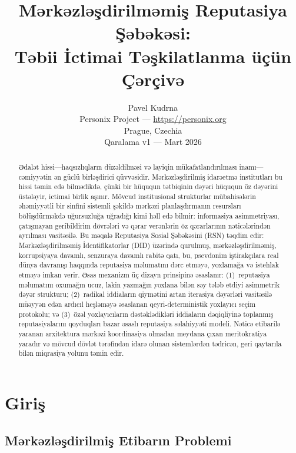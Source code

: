 \documentclass[11pt,a4paper,twocolumn]{article}
\title{\textbf{Mərkəzləşdirilməmiş Reputasiya Şəbəkəsi:\\Təbii İctimai Təşkilatlanma üçün Çərçivə}}
\author{Pavel Kudrna\\Personix Project --- \url{https://personix.org}\\Prague, Czechia\\Qaralama v1 --- Mart 2026}
\date{}
\begin{document}
\maketitle

\begin{abstract}
Ədalət hissi---haqsızlıqların düzəldilməsi və layiqin mükafatlandırılması inamı---cəmiyyətin ən güclü birləşdirici qüvvəsidir. Mərkəzləşdirilmiş idarəetmə institutları bu hissi təmin edə bilmədikdə, çünki bir hüququn tətbiqinin dəyəri hüququn öz dəyərini üstələyir, ictimai birlik aşınır. Mövcud institusional strukturlar mübahisələrin əhəmiyyətli bir sinfini sistemli şəkildə mərkəzi planlaşdırmanın resursları bölüşdürməkdə uğursuzluğa uğradığı kimi həll edə bilmir: informasiya asimmetriyası, çatışmayan geribildirim dövrələri və qərar verənlərin öz qərarlarının nəticələrindən ayrılması vasitəsilə. Bu məqalə Reputasiya Sosial Şəbəkəsini (RSN) təqdim edir: Mərkəzləşdirilməmiş İdentifikatorlar (DID) üzərində qurulmuş, mərkəzləşdirilməmiş, korrupsiyaya davamlı, senzuraya davamlı rabitə qatı, bu, psevdonim iştirakçılara real dünya davranışı haqqında reputasiya məlumatını dərc etməyə, yoxlamağa və istehlak etməyə imkan verir. Əsas mexanizm üç dizayn prinsipinə əsaslanır: (1)~reputasiya məlumatını oxumağın ucuz, lakin yazmağın yoxlana bilən səy tələb etdiyi asimmetrik dəyər strukturu; (2)~radikal iddiaların qiymətini artan iterasiya dəyərləri vasitəsilə müəyyən edən ardıcıl heşləməyə əsaslanan qeyri-deterministik yoxlayıcı seçim protokolu; və (3)~özəl yoxlayıcıların dəstəklədikləri iddiaların dəqiqliyinə toplanmış reputasiyalarını qoyduqları bazar əsaslı reputasiya səlahiyyəti modeli. Nəticə etibarilə yaranan arxitektura mərkəzi koordinasiya olmadan meydana çıxan meritokratiya yaradır və mövcud dövlət tərəfindən idarə olunan sistemlərdən tədricən, geri qaytarıla bilən miqrasiya yolunu təmin edir.
\end{abstract}

\section{Giriş}

\subsection{Mərkəzləşdirilmiş Etibarın Problemi}
\end{document}
